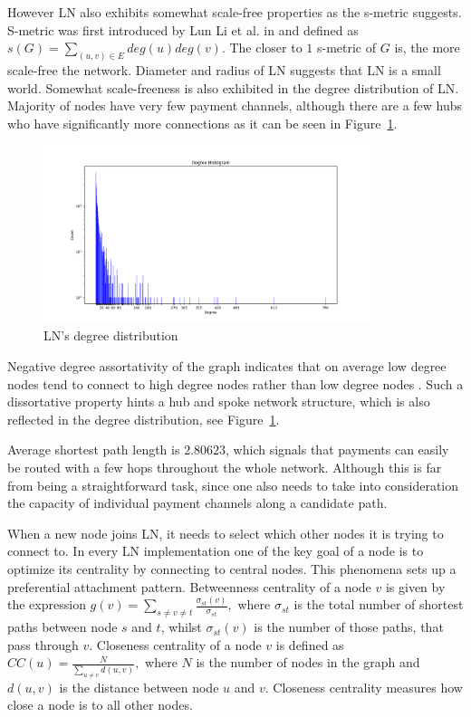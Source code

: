 \documentclass[a4paper]{article}
\theoremstyle{definition}
\begin{document}
However LN also exhibits somewhat scale-free properties as the s-metric suggests. S-metric was first introduced by Lun Li et al. in \cite{li2005towards} and defined as $s(G)=\sum_{(u,v)\in E}deg(u)deg(v)$. The closer to $1$  s-metric of $G$ is, the more scale-free the network. Diameter and radius of LN suggests that LN is a small world. Somewhat scale-freeness is also exhibited in the degree distribution of LN. Majority of nodes have very few payment channels, although there are a few hubs who have significantly more connections as it can be seen in Figure~\ref{fig:degreedist}.

\begin{figure}
	\caption{LN's degree distribution}\label{fig:degreedist}
	\begin{center}
		\includegraphics[width=0.85\textwidth]{degreehistogramlogscale.png}
	\end{center}	
\end{figure}

Negative degree assortativity of the graph indicates that on average low degree nodes tend to connect to high degree nodes rather than low degree nodes \cite{newman2002assortative}. Such a dissortative property hints a hub and spoke network structure, which is also reflected in the degree distribution, see Figure~\ref{fig:degreedist}.

Average shortest path length is $2.80623$, which signals that payments can easily be routed with a few hops throughout the whole network. Although this is far from being a straightforward task, since one also needs to take into consideration the capacity of individual payment channels along a candidate path.

When a new node joins LN, it needs to select which other nodes it is trying to connect to. In every LN implementation one of the key goal of a node is to optimize its centrality by connecting to central nodes. This phenomena sets up a preferential attachment pattern. Betweenness centrality of a node $v$ is given by the expression $g(v)=\sum_{s\neq v \neq t}\frac{\sigma_{st}(v)}{\sigma_{st}},$ where $\sigma_{st}$ is the total number of shortest paths between node $s$ and $t$, whilst $\sigma_{st}(v)$ is the number of those paths, that pass through $v$. Closeness centrality  of a node $v$ is defined as $CC(u)=\frac{N}{\sum_{u\neq v}d(u,v)},$ where $N$ is the number of nodes in the graph and $d(u,v)$ is the distance between node $u$ and $v$.  Closeness centrality measures how close a node is to all other nodes. 
\end{document}
